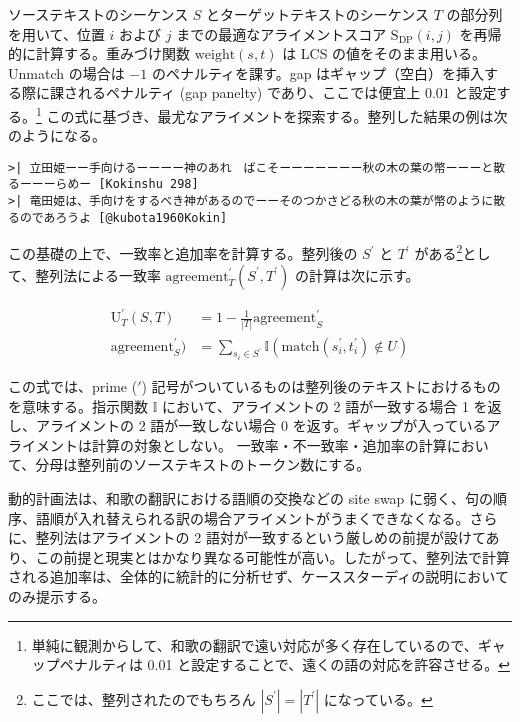 \documentclass[
  letterpaper,
  DIV=11,
  numbers=noendperiod]{scrartcl}
\begin{document}
ソーステキストのシーケンス \(S\) とターゲットテキストのシーケンス \(T\)
の部分列を用いて、位置 \(i\) および \(j\) までの最適なアライメントスコア
\(\text{S}_{\text{DP}}(i,j)\) を再帰的に計算する。重みづけ関数
\(\text{weight}(s,t)\) は LCS の値をそのまま用いる。Unmatch の場合は
\(-1\) のペナルティを課す。gap
はギャップ（空白）を挿入する際に課されるペナルティ (gap panelty)
であり、ここでは便宜上 \(0.01\) と設定する。\footnote{単純に観測からして、和歌の翻訳で遠い対応が多く存在しているので、ギャップペナルティは
  0.01 と設定することで、遠くの語の対応を許容させる。}
この式に基づき、最尤なアライメントを探索する。整列した結果の例は次のようになる。

\begin{verbatim}
>| 立田姫ーー手向けるーーーー神のあれ　ばこそーーーーーーー秋の木の葉の幣ーーーと散るーーーらめー [Kokinshu 298]
>| 竜田姫は、手向けをするべき神があるのでーーそのつかさどる秋の木の葉が幣のように散るのであろうよ [@kubota1960Kokin]
\end{verbatim}

この基礎の上で、一致率と追加率を計算する。整列後の \(S^{\prime}\) と
\(T^{\prime}\) がある\footnote{ここでは、整列されたのでもちろん
  \(|S^{\prime}| = |T^{\prime}|\) になっている。}として、整列法による一致率
\(\text{agreement}^{\prime}_{T}(S^{\prime},T^{\prime})\)
の計算は次に示す。

\[
\begin{align}
\text{U}^{\prime}_{T}(S,T) &= 1-\frac{1}{|T|}\text{agreement}^{\prime}_{S}\\
\text{agreement}^{\prime}_{S}) &= \sum_{s_i \in S^{\prime}} \mathbb{I} \left(\text{match}(s_i^{\prime}, t_i^{\prime}) \notin U \right)
\end{align}
\]

この式では、prime (\(\prime\))
記号がついているものは整列後のテキストにおけるものを意味する。指示関数
\(\mathbb{I}\) において、アライメントの 2 語が一致する場合 1
を返し、アライメントの 2 語が一致しない場合 0
を返す。ギャップが入っているアライメントは計算の対象としない。
一致率・不一致率・追加率の計算において、分母は整列前のソーステキストのトークン数にする。

動的計画法は、和歌の翻訳における語順の交換などの site swap
に弱く、句の順序、語順が入れ替えられる訳の場合アライメントがうまくできなくなる。さらに、整列法はアライメントの
2
語対が一致するという厳しめの前提が設けてあり、この前提と現実とはかなり異なる可能性が高い。したがって、整列法で計算される追加率は、全体的に統計的に分析せず、ケーススターディの説明においてのみ提示する。
\end{document}
